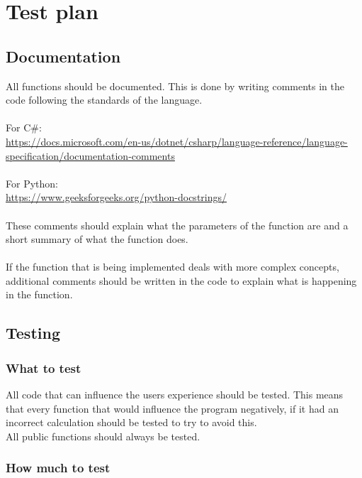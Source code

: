 \section{Test plan}

\subsection{Documentation}
All functions should be documented. 
This is done by writing comments in the code following the standards of the language.
\\\\
For C\#: 
\\
\url{https://docs.microsoft.com/en-us/dotnet/csharp/language-reference/language-specification/documentation-comments}
\\\\
For Python:
\\
\url{https://www.geeksforgeeks.org/python-docstrings/}
\\\\
These comments should explain what the parameters of the function are and a short summary of what the function does.
\\\\
If the function that is being implemented deals with more complex concepts, additional comments should be written in the code to explain what is happening in the function.

\subsection{Testing}
\subsubsection{What to test}
All code that can influence the users experience should be tested. 
This means that every function that would influence the program negatively, if it had an incorrect calculation should be tested to try to avoid this.
\\
All public functions should always be tested.

\subsubsection{How much to test}

